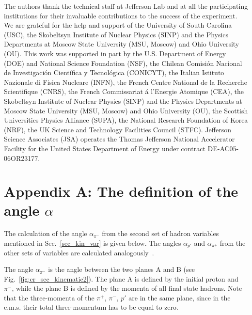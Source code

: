 \documentclass[prc,twocolumn,superscriptaddress,showpacs,amssymb,amsmath,amsfonts,aps,nofootinbib]{revtex4-1}
\begin{document}
\begin{acknowledgments}

The authors thank the technical staff at Jefferson Lab
and at all the participating institutions for their invaluable
contributions to the success of the experiment.
We are grateful for the help and support of the University of South Carolina (USC), the
Skobeltsyn Institute of Nuclear Physics (SINP) and the
Physics Departments at Moscow State University (MSU,
Moscow) and Ohio University (OU). 
This work was supported in part by the U.S. Department
of Energy (DOE) and National Science Foundation
(NSF), the Chilean Comisi\'on Nacional de Investigaci\'on
Cient\'ifica y Tecnol\'ogica (CONICYT), the Italian Istituto
Nazionale di Fisica Nucleare (INFN), the French Centre
National de la Recherche Scientifique (CNRS), the
French Commissariat \'a l'Energie Atomique (CEA), the
Skobeltsyn Institute of Nuclear Physics (SINP) and the
Physics Departments at Moscow State University (MSU,
Moscow) and Ohio University (OU), the Scottish Universities
Physics Alliance (SUPA), the National Research
Foundation of Korea (NRF), the UK Science and Technology
Facilities Council (STFC). Jefferson Science Associates
(JSA) operates the Thomas Jefferson National
Accelerator Facility for the United States Department of
Energy under contract DE-AC05-06OR23177.

\end{acknowledgments}

\clearpage
\section*{Appendix A: The definition of the angle $\alpha$}
\label{app_a}


The calculation of the angle $\alpha_{\pi^{-}}$ from the second set of hadron variables mentioned in Sec.~\ref{sec_kin_var} is given below. The angles $\alpha_{p'}$ and $\alpha_{\pi^{+}}$ from the other sets of variables are calculated analogously~\cite{Fed_an_note:2017}.

The angle $\alpha_{\pi^{-}}$ is the angle between the two planes A and B (see Fig.~\ref{fig:cr_sec_kinematic2}).
The plane A is defined by
the initial proton and $\pi^{-}$, while the plane B is defined by the momenta of
all final state hadrons. Note that the three-momenta of the $\pi^{+}$,
$\pi^{-}$, $p'$ are in the same plane, since in the c.m.s.
their total three-momentum has to be equal to zero.
\end{document}
